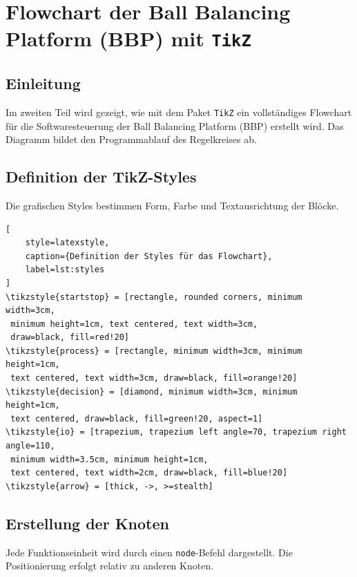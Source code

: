 \documentclass{article}
\begin{document}
\section{Flowchart der Ball Balancing Platform (BBP) mit \texttt{TikZ}}

\subsection{Einleitung}
Im zweiten Teil wird gezeigt, wie mit dem Paket \texttt{TikZ} ein vollständiges
Flowchart für die Softwaresteuerung der Ball Balancing Platform (BBP) erstellt wird.
Das Diagramm bildet den Programmablauf des Regelkreises ab.

\subsection{Definition der TikZ-Styles}
Die grafischen Styles bestimmen Form, Farbe und Textausrichtung der Blöcke.

\begin{lstlisting}[
    style=latexstyle,
    caption={Definition der Styles für das Flowchart},
    label=lst:styles
]
\tikzstyle{startstop} = [rectangle, rounded corners, minimum width=3cm,
 minimum height=1cm, text centered, text width=3cm,
 draw=black, fill=red!20]
\tikzstyle{process} = [rectangle, minimum width=3cm, minimum height=1cm,
 text centered, text width=3cm, draw=black, fill=orange!20]
\tikzstyle{decision} = [diamond, minimum width=3cm, minimum height=1cm,
 text centered, draw=black, fill=green!20, aspect=1]
\tikzstyle{io} = [trapezium, trapezium left angle=70, trapezium right angle=110,
 minimum width=3.5cm, minimum height=1cm,
 text centered, text width=2cm, draw=black, fill=blue!20]
\tikzstyle{arrow} = [thick, ->, >=stealth]
\end{lstlisting}

\subsection{Erstellung der Knoten}
Jede Funktionseinheit wird durch einen \texttt{node}-Befehl dargestellt.  
Die Positionierung erfolgt relativ zu anderen Knoten.
\end{document}
